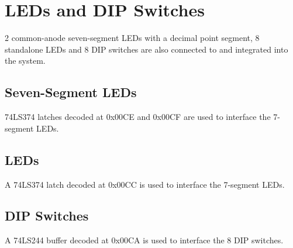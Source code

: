 \newpage
\section{LEDs and DIP Switches}
2 common-anode seven-segment LEDs with a decimal point segment, 8 standalone LEDs and 8 DIP switches are also connected to and integrated into the system. 

    \subsection{Seven-Segment LEDs}
    74LS374 latches decoded at 0x00CE and 0x00CF are used to interface the 7-segment LEDs.

    \subsection{LEDs}
    A 74LS374 latch decoded at 0x00CC is used to interface the 7-segment LEDs.

    \subsection{DIP Switches}
    A 74LS244 buffer decoded at 0x00CA is used to interface the 8 DIP switches.
